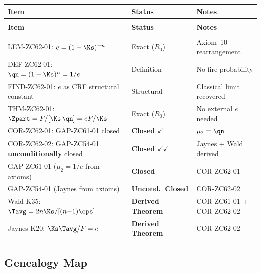 \documentclass[12pt, a4paper]{article}
\begin{document}
{\small
\setlength{\LTpre}{4pt}\setlength{\LTpost}{4pt}
\renewcommand{\arraystretch}{1.30}
\begin{longtable}{>{\raggedright\arraybackslash}p{7.2cm}
                  >{\centering\arraybackslash}p{2.6cm}
                  >{\raggedright\arraybackslash}p{2.8cm}}
\toprule
\textbf{Item} & \textbf{Status} & \textbf{Notes} \\
\midrule
\endfirsthead
\multicolumn{3}{l}{\small\textit{(continued)}}\\[4pt]
\toprule
\textbf{Item} & \textbf{Status} & \textbf{Notes} \\
\midrule
\endhead
\midrule
\multicolumn{3}{r}{\small\textit{(continues)}}\\
\endfoot
\bottomrule
\endlastfoot
LEM-ZC62-01: $e = (1-\Ks)^{-n}$
  & Exact ($R_0$) & Axiom~10 rearrangement \\
DEF-ZC62-01: $\qn = (1-\Ks)^n = 1/e$
  & Definition & No-fire probability \\
FIND-ZC62-01: $e$ as CRF structural constant
  & Structural & Classical limit recovered \\
THM-ZC62-01: $\Zpart = F/[\Ks\,\qn] = eF/\Ks$
  & Exact ($R_0$) & No external $e$ needed \\
COR-ZC62-01: GAP-ZC61-01 closed
  & \textbf{Closed} $\checkmark$ & $\mu_2 = \qn$ \\
COR-ZC62-02: GAP-ZC54-01 \textbf{unconditionally} closed
  & \textbf{Closed} $\checkmark\checkmark$ & Jaynes + Wald derived \\
\midrule
GAP-ZC61-01 ($\mu_2 = 1/e$ from axioms)
  & \textbf{Closed} & COR-ZC62-01 \\
GAP-ZC54-01 (Jaynes from axioms)
  & \textbf{Uncond.\ Closed} & COR-ZC62-02 \\
Wald K35: $\Tavg = 2n\Ks/[(n{-}1)\eps]$
  & \textbf{Derived Theorem} & COR-ZC61-01 + COR-ZC62-02 \\
Jaynes K20: $\Ks\Tavg/F = e$
  & \textbf{Derived Theorem} & COR-ZC62-02 \\
\bottomrule
\end{longtable}
}

\subsection{Genealogy Map}
\label{sec:genealogy}
\end{document}
